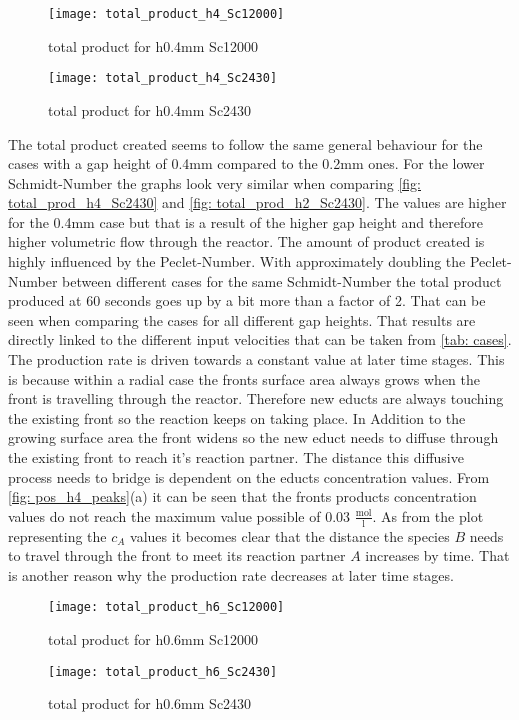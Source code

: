 \documentclass[../thesis.tex]{subfiles}
\begin{document}
\begin{figure}[htbp]
	\centering
	\texttt{[image: total\_product\_h4\_Sc12000]}
	\caption{total product for h0.4mm Sc12000\label{fig: total_prod_h4_Sc12000}}\bigskip
	\texttt{[image: total\_product\_h4\_Sc2430]}
	\caption{total product for h0.4mm Sc2430\label{fig: total_prod_h4_Sc2430}}
\end{figure}

The total product created seems to follow the same general behaviour for the cases with a gap height of 0.4mm compared to the 0.2mm ones. For the lower Schmidt-Number the graphs look very similar when comparing \autoref{fig: total_prod_h4_Sc2430} and \autoref{fig: total_prod_h2_Sc2430}. The values are higher for the 0.4mm case but that is a result of the higher gap height and therefore higher volumetric flow through the reactor. The amount of product created is highly influenced by the Peclet-Number. With approximately doubling the Peclet-Number between different cases for the same Schmidt-Number the total product produced at 60 seconds goes up by a bit more than a factor of 2. That can be seen when comparing the cases for all different gap heights. That results are directly linked to the different input velocities that can be taken from \autoref{tab: cases}. The production rate is driven towards a constant value at later time stages. This is because within a radial case the fronts surface area always grows when the front is travelling through the reactor. Therefore new educts are always touching the existing front so the reaction keeps on taking place. In Addition to the growing surface area the front widens so the new educt needs to diffuse through the existing front to reach it's reaction partner. The distance this diffusive process needs to bridge is dependent on the educts concentration values. From \autoref{fig: pos_h4_peaks}(a) it can be seen that the fronts products concentration values do not reach the maximum value possible of 0.03 $ \frac{\text{mol}}{\text{l}} $. As from the plot representing the $ c_A $ values it becomes clear that the distance the species $B$ needs to travel through the front to meet its reaction partner $A$ increases by time. That is another reason why the production rate decreases at later time stages.
\begin{figure}[htbp]
	\centering
	\texttt{[image: total\_product\_h6\_Sc12000]}
	\caption{total product for h0.6mm Sc12000\label{fig: total_prod_h6_Sc12000}}\bigskip
	\texttt{[image: total\_product\_h6\_Sc2430]}
	\caption{total product for h0.6mm Sc2430\label{fig: total_prod_h6_Sc2430}}
\end{figure}
\newline
\end{document}
